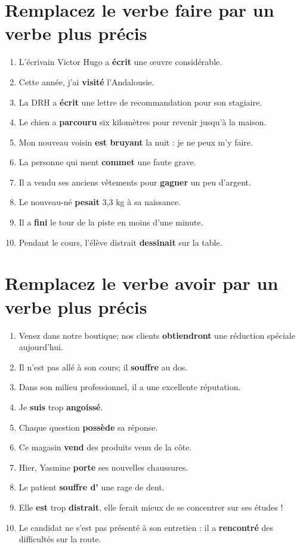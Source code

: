 \documentclass[12pt]{article}
\newcommand{\colo}[1]{{\color{blue}\textbf{#1}}}
\begin{document}
\section{Remplacez le verbe faire par un verbe plus précis} 
\begin{enumerate}
	\item L’écrivain Victor Hugo a \colo{écrit} une œuvre considérable. 
	\item Cette année, j’ai \colo{visité} l’Andalousie. 
	\item La DRH a \colo{écrit} une lettre de recommandation pour son stagiaire. 
	\item Le chien a \colo{parcouru} six kilomètres pour revenir jusqu’à la maison. 
	\item Mon nouveau voisin \colo{est bruyant} la nuit : je ne peux m’y faire. 
	\item La personne qui ment \colo{commet} une faute grave. 
	\item Il a vendu ses anciens vêtements pour \colo{gagner} un peu d’argent. 
	\item Le nouveau-né \colo{pesait} 3,3 kg à sa naissance. 
	\item Il a \colo{fini} le tour de la piste en moins d’une minute. 
	\item Pendant le cours, l’élève distrait \colo{dessinait} sur la table.
\end{enumerate}

\section{Remplacez le verbe avoir par un verbe plus précis}
\begin{enumerate}
	\item Venez dans notre boutique; nos clients \colo{obtiendront}  une réduction spéciale aujourd’hui. 
	\item Il n’est pas allé à son cours; il \colo{souffre} au dos. 
	\item Dans son milieu professionnel, il a une excellente réputation. 
	\item Je \colo{suis} trop \colo{angoissé}. 
	\item Chaque question \colo{possède} sa réponse. 
	\item Ce magasin \colo{vend} des produits venu de la côte. 
	\item Hier, Yasmine \colo{porte} ses nouvelles chaussures. 
	\item Le patient \colo{souffre d'} une rage de dent. 
	\item Elle \colo{est} trop \colo{distrait}, elle ferait mieux de se concentrer sur ses études ! 
	\item Le candidat ne s’est pas présenté à son entretien : il a \colo{rencontré} des difficultés sur la route.
\end{enumerate}
\end{document}

